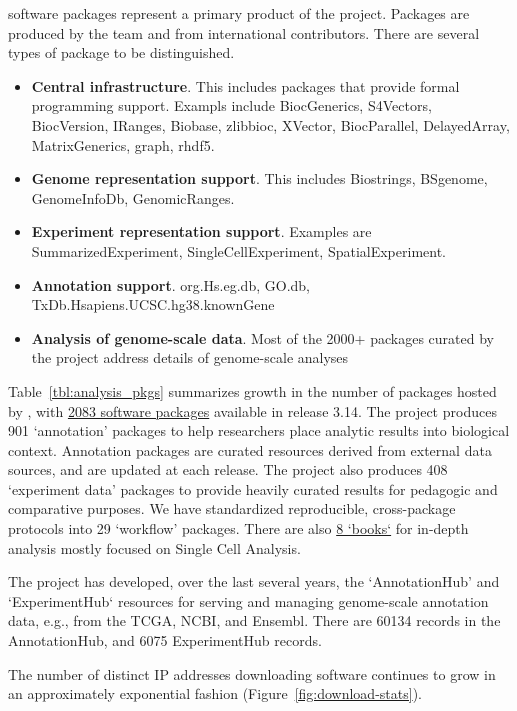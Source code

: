 \documentclass[letterpaper]{article}
\begin{document}
\R{} software packages represent a primary product of the
\Bioconductor{} project. Packages are produced by the \Bioconductor{}
team and from international
contributors.  There are several types of package to be distinguished.

\begin{itemize}
\item \textbf{Central infrastructure}.  This includes packages that
provide formal programming support.
Exampls include
BiocGenerics,
S4Vectors,
BiocVersion,
IRanges,
Biobase,
zlibbioc,
XVector,
BiocParallel,
DelayedArray,
MatrixGenerics, graph, rhdf5.
\item \textbf{Genome representation support}.  This includes
Biostrings, BSgenome, GenomeInfoDb, GenomicRanges.
\item \textbf{Experiment representation support}.  Examples are
SummarizedExperiment, SingleCellExperiment, SpatialExperiment.
\item \textbf{Annotation support}.
org.Hs.eg.db, GO.db, TxDb.Hsapiens.UCSC.hg38.knownGene
\item \textbf{Analysis of genome-scale data}.  Most of the 2000+
packages curated by the project address details of genome-scale
analyses
\end{itemize}

Table~\ref{tbl:analysis_pkgs} summarizes growth in the
number of packages hosted by \Bioconductor{}, with
\href{https://bioconductor.org/packages/3.14}{2083 software packages}
available in release 3.14.  The project produces 901 `annotation'
packages to help researchers place analytic results into biological
context. Annotation packages are curated resources derived from
external data sources, and are updated at each release. The project
also produces 408 `experiment data' packages to provide heavily
curated results for pedagogic and comparative purposes. We have
standardized reproducible, cross-package protocols into 29 `workflow'
packages. There are also
\href{http://bioconductor.org/checkResults/3.14/books-LATEST/}{8 `books`} for
in-depth analysis mostly focused on Single Cell Analysis.


The project has developed, over the last several years, the
`AnnotationHub' and `ExperimentHub` resources for serving and managing
genome-scale annotation data, e.g., from the TCGA, NCBI, and
Ensembl. There are 60134 records in the AnnotationHub, and 6075
ExperimentHub records.

The number of distinct IP addresses downloading software continues to
grow in an approximately exponential fashion
(Figure~\ref{fig:download-stats}).
\end{document}
